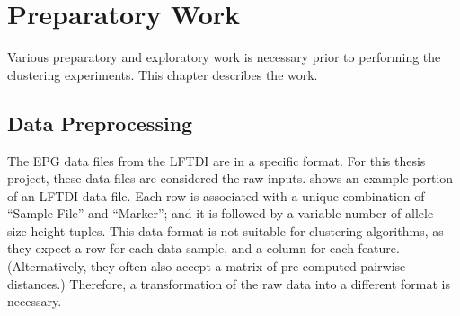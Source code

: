 
\chapter{Preparatory Work}
\label{ch:Preparatory Work}
\thispagestyle{myheadings}

Various preparatory and exploratory work is necessary prior to performing the clustering experiments. This chapter describes the work.

\section{Data Preprocessing}
\label{section:Data Preprocessing}

The EPG data files from the LFTDI are in a specific format. For this thesis project, these data files are considered the raw inputs.  shows an example portion of an LFTDI data file. Each row is associated with a unique combination of ``Sample File'' and ``Marker''; and it is followed by a variable number of allele-size-height tuples. This data format is not suitable for clustering algorithms, as they expect a row for each data sample, and a column for each feature. (Alternatively, they often also accept a matrix of pre-computed pairwise distances.) Therefore, a transformation of the raw data into a different format is necessary.

